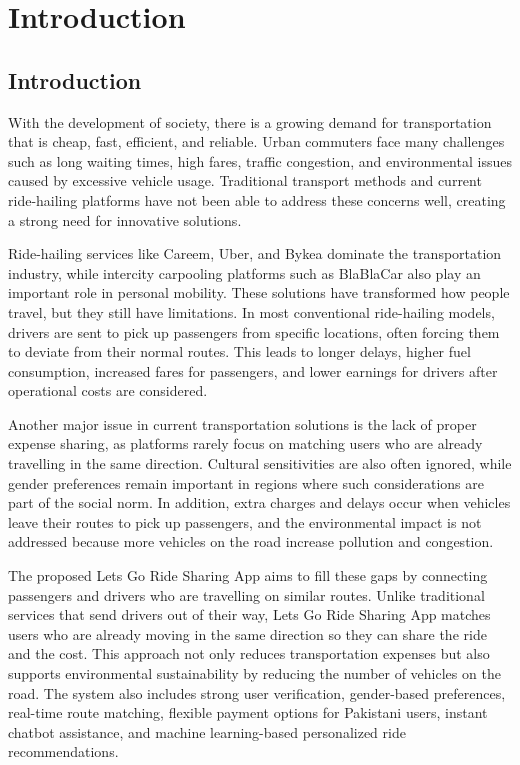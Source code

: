 
\chapter{Introduction}


\section{Introduction}

With the development of society, there is a growing demand for transportation that is cheap, fast, efficient, and reliable. Urban commuters face many challenges such as long waiting times, high fares, traffic congestion, and environmental issues caused by excessive vehicle usage. Traditional transport methods and current ride-hailing platforms have not been able to address these concerns well, creating a strong need for innovative solutions.

Ride-hailing services like Careem, Uber, and Bykea dominate the transportation industry, while intercity carpooling platforms such as BlaBlaCar also play an important role in personal mobility. These solutions have transformed how people travel, but they still have limitations. In most conventional ride-hailing models, drivers are sent to pick up passengers from specific locations, often forcing them to deviate from their normal routes. This leads to longer delays, higher fuel consumption, increased fares for passengers, and lower earnings for drivers after operational costs are considered.

Another major issue in current transportation solutions is the lack of proper expense sharing, as platforms rarely focus on matching users who are already travelling in the same direction. Cultural sensitivities are also often ignored, while gender preferences remain important in regions where such considerations are part of the social norm. In addition, extra charges and delays occur when vehicles leave their routes to pick up passengers, and the environmental impact is not addressed because more vehicles on the road increase pollution and congestion.

The proposed Lets Go Ride Sharing App aims to fill these gaps by connecting passengers and drivers who are travelling on similar routes. Unlike traditional services that send drivers out of their way, Lets Go Ride Sharing App matches users who are already moving in the same direction so they can share the ride and the cost. This approach not only reduces transportation expenses but also supports environmental sustainability by reducing the number of vehicles on the road. The system also includes strong user verification, gender-based preferences, real-time route matching, flexible payment options for Pakistani users, instant chatbot assistance, and machine learning-based personalized ride recommendations.

